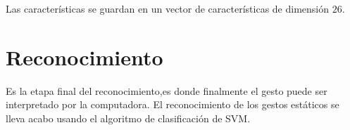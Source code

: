 Las características se guardan en un vector de características de dimensión $26$.

\section{Reconocimiento}\label{sec:ReconocimientoSystem}

Es la etapa final del reconocimiento,es donde finalmente el gesto puede ser interpretado por la computadora.   
El reconocimiento de los gestos estáticos se lleva acabo usando el algoritmo de clasificación de SVM. 




%


%
%
%
%  
	
\newpage

